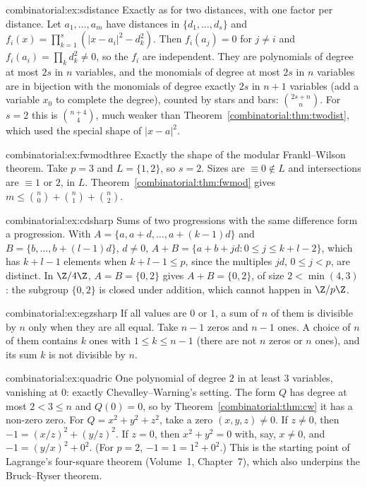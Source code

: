 \begin{solution}{combinatorial:ex:sdistance}
\idea Exactly as for two distances, with one factor per distance.
\writeup Let $a_1,\dots,a_m$ have distances in $\{d_1,\dots,d_s\}$ and $f_i(x)=\prod_{k=1}^s(|x-a_i|^2-d_k^2)$. Then $f_i(a_j)=0$ for $j\ne i$ and $f_i(a_i)=\prod_kd_k^2\ne0$, so the $f_i$ are independent. They are
polynomials of degree at most $2s$ in $n$ variables, and the monomials of degree at most $2s$ in $n$ variables are in bijection with the monomials of degree exactly $2s$ in $n+1$ variables (add a variable $x_0$
to complete the degree), counted by stars and bars: $\binom{2s+n}{n}$. For $s=2$ this is $\binom{n+4}4$, much weaker than Theorem~\ref{combinatorial:thm:twodist}, which used the special shape of $|x-a|^2$.
\end{solution}

\begin{solution}{combinatorial:ex:fwmodthree}
\idea Exactly the shape of the modular Frankl--Wilson theorem.
\writeup Take $p=3$ and $L=\{1,2\}$, so $s=2$. Sizes are $\equiv0\notin L$ and intersections are $\equiv1$ or $2$, in $L$. Theorem~\ref{combinatorial:thm:fwmod} gives $m\le\binom n0+\binom n1+\binom n2$.
\end{solution}

\begin{solution}{combinatorial:ex:cdsharp}
\idea Sums of two progressions with the same difference form a progression.
\writeup With $A=\{a,a+d,\dots,a+(k-1)d\}$ and $B=\{b,\dots,b+(l-1)d\}$, $d\ne0$, $A+B=\{a+b+jd:0\le j\le k+l-2\}$, which has $k+l-1$ elements when $k+l-1\le p$, since the multiples $jd$, $0\le j<p$, are distinct. In
$\Z/4\Z$, $A=B=\{0,2\}$ gives $A+B=\{0,2\}$, of size $2<\min(4,3)$: the subgroup $\{0,2\}$ is closed under addition, which cannot happen in $\Z/p\Z$.
\end{solution}

\begin{solution}{combinatorial:ex:egzsharp}
\idea If all values are $0$ or $1$, a sum of $n$ of them is divisible by $n$ only when they are all equal.
\writeup Take $n-1$ zeros and $n-1$ ones. A choice of $n$ of them contains $k$ ones with $1\le k\le n-1$ (there are not $n$ zeros or $n$ ones), and its sum $k$ is not divisible by $n$.
\end{solution}

\begin{solution}{combinatorial:ex:quadric}
\idea One polynomial of degree $2$ in at least $3$ variables, vanishing at $0$: exactly Chevalley--Warning's setting.
\writeup The form $Q$ has degree at most $2<3\le n$ and $Q(0)=0$, so by Theorem~\ref{combinatorial:thm:cw} it has a non-zero zero. For $Q=x^2+y^2+z^2$, take a zero $(x,y,z)\ne0$. If $z\ne0$, then $-1=(x/z)^2+(y/z)^2$. If $z=0$,
then $x^2+y^2=0$ with, say, $x\ne0$, and $-1=(y/x)^2+0^2$. (For $p=2$, $-1=1=1^2+0^2$.) This is the starting point of Lagrange's four-square theorem (Volume~1, Chapter~7), which also underpins the
Bruck--Ryser theorem.
\end{solution}

